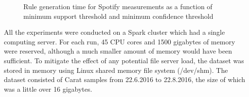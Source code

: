 \begin{figure} %



\caption{Rule generation time for Spotify measurements as a function of minimum support threshold and minimum confidence threshold}
\label{figure:runtimes-spotify}
\end{figure}

All the experiments were conducted on a Spark cluster which had a single computing server. For each run, 45 CPU cores and 1500 gigabytes of memory were reserved, although a much smaller amount of memory would have been sufficient. To mitigate the effect of any potential file server load, the dataset was stored in memory using Linux shared memory file system (/dev/shm). The dataset consisted of Carat samples from 22.6.2016 to 22.8.2016, the size of which was a little over 16 gigabytes.


